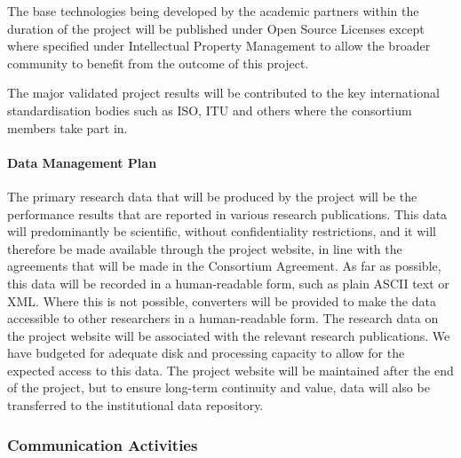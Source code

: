 \documentclass[a4paper,11pt]{article}
\begin{document}
The base technologies being developed by the academic partners within the duration of the project will be published under Open Source Licenses except where specified under Intellectual Property Management to allow the broader community to benefit from the outcome of this project.

The major validated project results  will be contributed to the key international standardisation bodies  such as ISO, ITU and others where the consortium members take part in. 


\paragraph{Data Management Plan}

The primary research data that will be produced by the project will be the performance results that are reported in
various research publications.  This data will predominantly be scientific,
without confidentiality restrictions, and it will
therefore be made available through the project website, in line with the agreements that will be
made in the Consortium Agreement.  As far as possible, 
this data will be recorded in a human-readable form, such as plain ASCII text
or XML.  Where this is not possible, converters will be provided to make the data accessible to other researchers
in a human-readable form. 
The research data on the project website will be associated with the relevant research publications. 
We have budgeted for adequate disk and processing capacity to allow for the expected access to this data.
The project website will be maintained after the end of the project, but to ensure long-term continuity
and value, data will also be transferred to the \SAshort{} institutional data repository.

\draftpage
\subsubsection{Communication Activities}
\label{sect:comm-activities}

\end{document}
